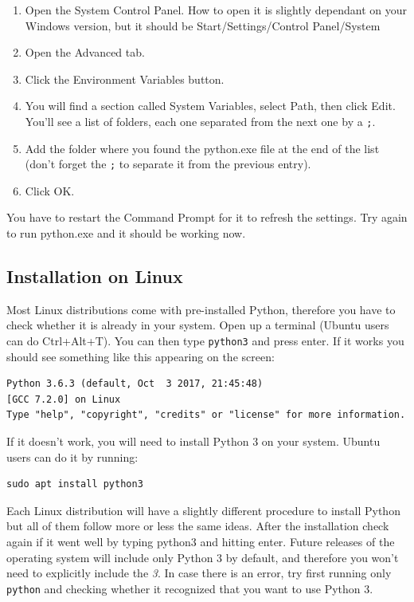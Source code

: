 \begin{enumerate}
 \item Open the System Control Panel. How to open it is slightly dependant on your Windows version, but it should be Start/Settings/Control Panel/System
 \item Open the Advanced tab.
 \item Click the Environment Variables button.
 \item You will find a section called System Variables, select Path, then click Edit. You’ll see a list of folders, each one separated from the next one by a \texttt{;}.
 \item Add the folder where you found the python.exe file at the end of the list (don’t forget the \texttt{;} to separate it from the previous entry). 
\item Click OK.
\end{enumerate}

You have to restart the Command Prompt for it to refresh the settings. Try again to run python.exe and it should be working now.

\subsection{Installation on Linux}
Most Linux distributions come with pre-installed Python, therefore you have to check whether it is already in your system. Open up a terminal (Ubuntu users can do Ctrl+Alt+T). You can then type \texttt{python3} and press enter. If it works you should see something like this appearing on the screen:

\begin{verbatim}
Python 3.6.3 (default, Oct  3 2017, 21:45:48)
[GCC 7.2.0] on Linux
Type "help", "copyright", "credits" or "license" for more information.
\end{verbatim}

If it doesn't work, you will need to install Python 3 on your system. Ubuntu users can do it by running:
\begin{verbatim}
sudo apt install python3
\end{verbatim}

Each Linux distribution will have a slightly different procedure to install Python but all of them follow more or less the same ideas. After the installation check again if it went well by typing python3 and hitting enter. Future releases of the operating system will include only Python 3 by default, and therefore you won't need to explicitly include the \emph{3}. In case there is an error, try first running only \texttt{python} and checking whether it recognized that you want to use Python 3.

